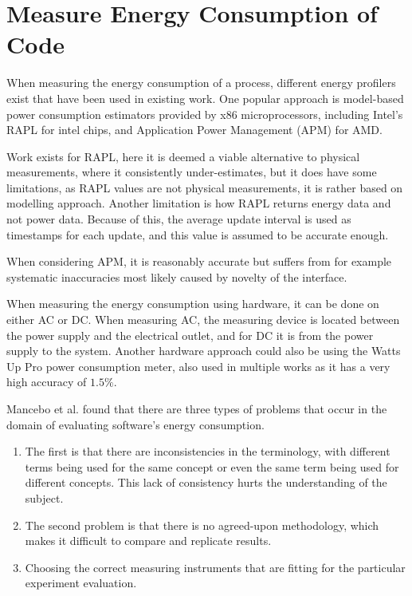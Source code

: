 
\section{Measure Energy Consumption of Code}

When measuring the energy consumption of a process, different energy profilers exist that have been used in existing work. One popular approach is model-based power consumption estimators provided by x86 microprocessors, including Intel's RAPL for intel chips, and Application Power Management (APM) for AMD.

Work exists for RAPL, here it is deemed a viable alternative to physical measurements, where it consistently under-estimates\cite[]{Dongarra2012, Hackenberg2013}, but it does have some limitations, as RAPL values are not physical measurements, it is rather based on modelling approach\cite[]{Hackenberg2013}. Another limitation is how RAPL returns energy data and not power data. Because of this, the average update interval is used as timestamps for each update, and this value is assumed to be accurate enough.\cite[]{Hackenberg2013}

When considering APM, it is reasonably accurate but suffers from for example systematic inaccuracies most likely caused by novelty of the interface.\cite[]{Hackenberg2013}


When measuring the energy consumption using hardware, it can be done on either AC or DC. When measuring AC, the measuring device is located between the power supply and the electrical outlet, and for DC it is from the power supply to the system.\cite[]{Hackenberg2013} Another hardware approach could also be using the Watts Up Pro power consumption meter, also used in multiple works as it has a very high accuracy of $1.5\%$.\cite[]{Jagroep2015}




Mancebo et al. found that there are three types of problems that occur in the domain of evaluating software's energy consumption.\cite{MANCEBO2021100558} 
\begin{enumerate}
    \item The first is that there are inconsistencies in the terminology, with different terms being used for the same concept or even the same term being used for different concepts. This lack of consistency hurts the understanding of the subject.
    \item The second problem is that there is no agreed-upon methodology, which makes it difficult to compare and replicate results.
    \item Choosing the correct measuring instruments that are fitting for the particular experiment evaluation.
\end{enumerate}

